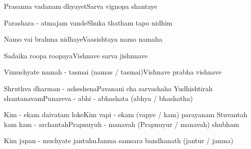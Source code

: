 \documentclass[20pt]{article}
\begin{document}

{Prasanna vadanam dhyayet}{Sarva vignopa shantaye}


{Parashara - atmajam vande}{Shuka thatham tapo nidhim}

{Namo vai brahma nidhaye}{Vaasishtaya namo namaha}
\newpage

{Sadaika roopa roopaya}{Vishnave sarva jishnnave}

{Vimuchyate namah - tasmai (namas / tasmai)}{Vishnave prabha vishnave}


{Shruthva dharman - asheshena}{Pavanani cha sarvashaha}
{Yudhishtirah shantanavam}{Punareva - abhi - abhashata (abhya / bhashatha)}

\newpage

{Kim - ekam daivatam loke}{Kim vapi - ekam (vapye / kam) parayanam}
{Stuvantah kam kam - archantah}{Prapnuyuh - manavah (Prapnuyur / manavah) shubham}

{Kim japan - muchyate jantuhu}{Janma samsara bandhanath (jantur / janma)}
\end{document}
